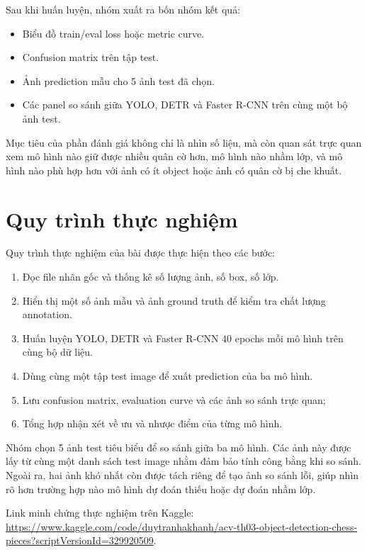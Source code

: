 \documentclass[12pt,a4paper]{article}
\begin{document}
Sau khi huấn luyện, nhóm xuất ra bốn nhóm kết quả:
\begin{itemize}[leftmargin=1.2cm]
    \item Biểu đồ train/eval loss hoặc metric curve.
    \item Confusion matrix trên tập test.
    \item Ảnh prediction mẫu cho 5 ảnh test đã chọn.
    \item Các panel so sánh giữa YOLO, DETR và Faster R-CNN trên cùng một bộ ảnh test.
\end{itemize}

Mục tiêu của phần đánh giá không chỉ là nhìn số liệu, mà còn quan sát trực quan xem mô hình nào giữ được nhiều quân cờ hơn, mô hình nào nhầm lớp, và mô hình nào phù hợp hơn với ảnh có ít object hoặc ảnh có quân cờ bị che khuất.

\section{Quy trình thực nghiệm}

Quy trình thực nghiệm của bài được thực hiện theo các bước:
\begin{enumerate}[leftmargin=1.2cm]
    \item Đọc file nhãn gốc và thống kê số lượng ảnh, số box, số lớp.
    \item Hiển thị một số ảnh mẫu và ảnh ground truth để kiểm tra chất lượng annotation.
    \item Huấn luyện YOLO, DETR và Faster R-CNN 40 epochs mỗi mô hình trên cùng bộ dữ liệu.
    \item Dùng cùng một tập test image để xuất prediction của ba mô hình.
    \item Lưu confusion matrix, evaluation curve và các ảnh so sánh trực quan;
    \item Tổng hợp nhận xét về ưu và nhược điểm của từng mô hình.
\end{enumerate}

Nhóm chọn 5 ảnh test tiêu biểu để so sánh giữa ba mô hình. Các ảnh này được lấy từ cùng một danh sách test image nhằm đảm bảo tính công bằng khi so sánh. Ngoài ra, hai ảnh khó nhất còn được tách riêng để tạo ảnh so sánh lỗi, giúp nhìn rõ hơn trường hợp nào mô hình dự đoán thiếu hoặc dự đoán nhầm lớp.

Link minh chứng thực nghiệm trên Kaggle: \href{https://www.kaggle.com/code/duytranhakhanh/acv-th03-object-detection-chess-pieces?scriptVersionId=329920509}{https://www.kaggle.com/code/duytranhakhanh/acv-th03-object-detection-chess-pieces?scriptVersionId=329920509}.
\end{document}
